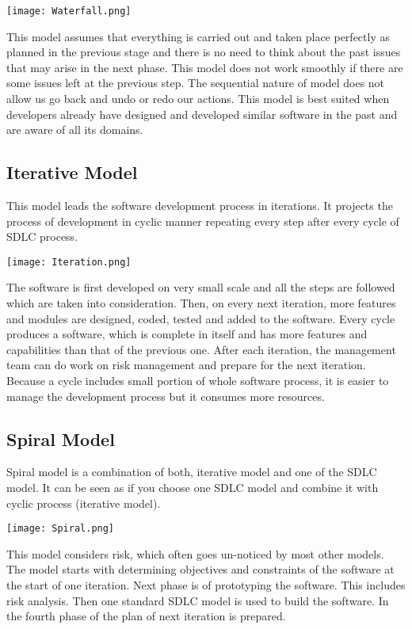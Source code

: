 \documentclass[11pt]{article}
\begin{document}
\begin{center}
\texttt{[image: Waterfall.png]}
\end{center}

This model assumes that everything is carried out and taken place perfectly as planned in the previous stage and there is no need to think about the past issues that may arise in the next phase. This model does not work smoothly if there are some issues left at the previous step. The sequential nature of model does not allow us go back and undo or redo our actions.
This model is best suited when developers already have designed and developed similar software in the past and are aware of all its domains.
\subsection{Iterative Model}
This model leads the software development process in iterations. It projects the process of development in cyclic manner repeating every step after every cycle of SDLC process.
 
\begin{center}
\texttt{[image: Iteration.png]}
\end{center}

The software is first developed on very small scale and all the steps are followed which are taken into consideration. Then, on every next iteration, more features and modules are designed, coded, tested and added to the software. Every cycle produces a software, which is complete in itself and has more features and capabilities than that of the previous one.
After each iteration, the management team can do work on risk management and prepare for the next iteration. Because a cycle includes small portion of whole software process, it is easier to manage the development process but it consumes more resources.
\subsection{Spiral Model}
Spiral model is a combination of both, iterative model and one of the SDLC model. It can be seen as if you choose one SDLC model and combine it with cyclic process (iterative model).
 
\begin{center}
\texttt{[image: Spiral.png]}
\end{center}

This model considers risk, which often goes un-noticed by most other models. The model starts with determining objectives and constraints of the software at the start of one iteration. Next phase is of prototyping the software. This includes risk analysis. Then one standard SDLC model is used to build the software. In the fourth phase of the plan of next iteration is prepared.
\end{document}
